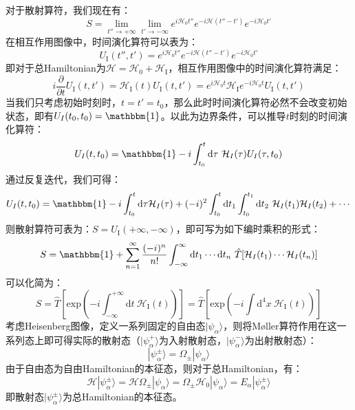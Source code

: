 对于散射算符，我们现在有：
\begin{equation}
S=\lim\limits_{t''\rightarrow+\infty}\lim\limits_{t'\rightarrow-\infty}e^{i\mathcal{H}_0t''}e^{-i\mathcal{H}(t''-t')}e^{-i\mathcal{H}_0t'}
\end{equation}
在相互作用图像中，时间演化算符可以表为：
\begin{equation}
U_{\text{I}}(t'',t')=e^{i\mathcal{H}_0t''}e^{-i\mathcal{H}(t''-t')}e^{-i\mathcal{H}_0t'}
\end{equation}
即对于总Hamiltonian为$\mathcal{H}=\mathcal{H}_0+\mathcal{H}_{\text{I}}$，相互作用图像中的时间演化算符满足：
\begin{equation}
i\frac{\partial}{\partial t}U_{\text{I}}(t,t')=\mathcal{H}_{\text{I}}(t)U_{\text{I}}(t,t')=e^{i\mathcal{H}_0t}\mathcal{H}_{\text{I}}e^{-i\mathcal{H}_0t}U_{\text{I}}(t,t')
\end{equation}
当我们只考虑初始时刻时，$t=t'=t_0$，那么此时时间演化算符必然不会改变初始状态，即有$U_I(t_0, t_0)=\mathbbm{1}$。以此为边界条件，可以推导$t$时刻的时间演化算符：
\begin{equation}
    U_I(t,t_0)=\mathbbm{1}-i\int_{t_0}^t \mathrm{d}\tau~ \mathcal{H}_I(\tau) U_I(\tau,t_0)
\end{equation}
通过反复迭代，我们可得：
\begin{equation}
    U_I(t,t_0)=\mathbbm{1}-i\int_{t_0}^t\mathrm{d}\tau \mathcal{H}_I(\tau) + (-i)^2\int_{t_0}^t\mathrm{d}t_1\int_{t_0}^{t_1}\mathrm{d}t_2~\mathcal{H}_I(t_1)\mathcal{H}_I(t_2)+\cdots
\end{equation}
则散射算符可表为：$S=U_{\text{I}}(+\infty,-\infty)$，即可写为如下编时乘积的形式：
\begin{equation}
    S=\mathbbm{1}+\sum_{n=1}^\infty\frac{(-i)^n}{n!}\int_{-\infty}^\infty\mathrm{d}t_1\cdots\mathrm{d}t_n~\hat{T}[\mathcal{H}_I(t_1)\cdots\mathcal{H}_I(t_n)]
\end{equation}
可以化简为：
\begin{equation}
S=\hat{T}\left[\mathrm{exp}\left(-i\int_{-\infty}^{+\infty}\mathrm{d}t~\mathcal{H}_{\text{I}}(t)\right)\right]=\hat{T}\left[\mathrm{exp}\left(-i\int\mathrm{d}^4x~\mathscr{H}_{\text{I}}(t)\right)\right]
\end{equation}
考虑Heisenberg图像，定义一系列固定的自由态$|\psi_{\alpha}\rangle$，则将M\o{}ller算符作用在这一系列态上即可得实际的散射态（$|\psi^{+}_\alpha\rangle$为入射散射态，$|\psi^{-}_\alpha\rangle$为出射散射态）：
\begin{equation}
|\psi^{\pm}_\alpha\rangle=\Omega_\pm|\psi_{\alpha}\rangle
\end{equation}
由于自由态为自由Hamiltonian的本征态，则对于总Hamiltonian，有：
\begin{equation}
\mathcal{H}|\psi^{\pm}_\alpha\rangle=\mathcal{H}\Omega_\pm|\psi_\alpha\rangle=\Omega_\pm\mathcal{H}_0|\psi_\alpha\rangle=E_\alpha|\psi^{\pm}_\alpha\rangle
\end{equation}
即散射态$|\psi^{\pm}_\alpha\rangle$为总Hamiltonian的本征态。

